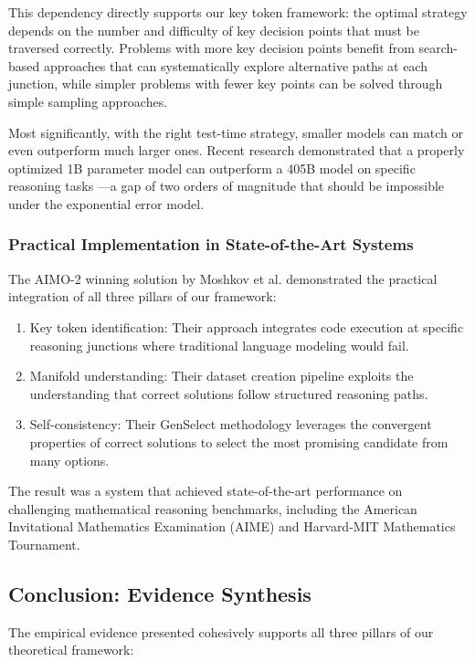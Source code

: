 \documentclass{article}
\begin{document}
This dependency directly supports our key token framework: the optimal strategy depends on the number and difficulty of key decision points that must be traversed correctly. Problems with more key decision points benefit from search-based approaches that can systematically explore alternative paths at each junction, while simpler problems with fewer key points can be solved through simple sampling approaches.

Most significantly, with the right test-time strategy, smaller models can match or even outperform much larger ones. Recent research demonstrated that a properly optimized 1B parameter model can outperform a 405B model on specific reasoning tasks \citep{venture2025test}—a gap of two orders of magnitude that should be impossible under the exponential error model.

\subsubsection{Practical Implementation in State-of-the-Art Systems}

The AIMO-2 winning solution by Moshkov et al. \citep{moshkov2025aimo} demonstrated the practical integration of all three pillars of our framework:

\begin{enumerate}
\item Key token identification: Their approach integrates code execution at specific reasoning junctions where traditional language modeling would fail.
\item Manifold understanding: Their dataset creation pipeline exploits the understanding that correct solutions follow structured reasoning paths.
\item Self-consistency: Their GenSelect methodology leverages the convergent properties of correct solutions to select the most promising candidate from many options.
\end{enumerate}

The result was a system that achieved state-of-the-art performance on challenging mathematical reasoning benchmarks, including the American Invitational Mathematics Examination (AIME) and Harvard-MIT Mathematics Tournament.

\subsection{Conclusion: Evidence Synthesis}

The empirical evidence presented cohesively supports all three pillars of our theoretical framework:
\end{document}
